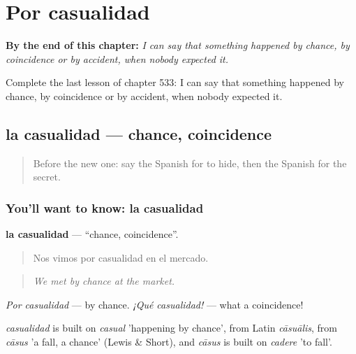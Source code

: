 
\chapter{Por casualidad}
\label{ch:es-por-casualidad}

\begin{chapteropening}
\textbf{By the end of this chapter:} \emph{I can say that something happened by chance, by coincidence or by accident, when nobody expected it.}

Complete the last lesson of chapter 533: I can say that something happened by chance, by coincidence or by accident, when nobody expected it.
\end{chapteropening}

\section[la casualidad]{la casualidad — chance, coincidence}

\label{lesson:ES-C533-casualidad}



\begin{quote}
Before the new one: say the Spanish for to hide, then the Spanish for the secret.
\end{quote}

\subsection*{You'll want to know: la casualidad}
\textbf{la casualidad} — \textquotedblleft{}chance, coincidence\textquotedblright{}.

\begin{quote}
Nos vimos por casualidad en el mercado.
\end{quote}

\begin{quote}
\emph{We met by chance at the market.}
\end{quote}

\emph{Por casualidad} — by chance. \emph{¡Qué casualidad!} — what a coincidence!

\begin{cousinweb}
\emph{casualidad} is built on \emph{casual} 'happening by chance', from Latin \emph{cāsuālis}, from \emph{cāsus} 'a fall, a chance' (Lewis \& Short), and \emph{cāsus} is built on \emph{cadere} 'to fall'.
\end{cousinweb}

